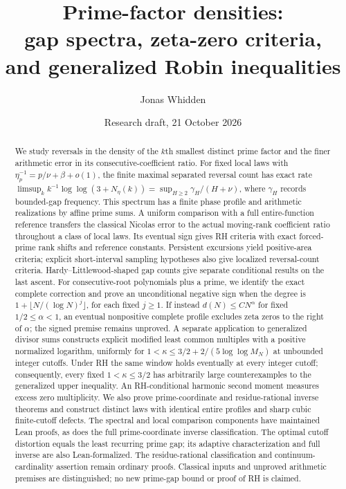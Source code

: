 \documentclass[11pt]{article}
\title{Prime-factor densities:\\ gap spectra, zeta-zero criteria,\\ and generalized Robin inequalities}
\author{Jonas Whidden}
\date{Research draft, 21 October 2026}
\theoremstyle{definition}
\begin{document}
\maketitle
\begin{abstract}
We study reversals in the density of the $k$th smallest distinct prime
factor and the finer arithmetic error in its consecutive-coefficient
ratio. For fixed local laws with $\eta_p^{-1}=p/\nu+\beta+o(1)$,
the finite maximal separated reversal count has exact rate
$\limsup_k k^{-1}\log\log(3+N_\eta(k))
=\sup_{H\ge2}\gamma_H/(H+\nu)$, where $\gamma_H$ records bounded-gap
frequency. This spectrum has a finite phase profile and arithmetic
realizations by affine prime sums.
A uniform comparison with a full entire-function reference transfers
the classical Nicolas error to the actual moving-rank coefficient
ratio throughout a class of local laws. Its eventual sign gives RH
criteria with exact forced-prime rank shifts and reference constants.
Persistent excursions yield positive-area criteria; explicit
short-interval sampling hypotheses also give localized reversal-count
criteria. Hardy--Littlewood-shaped gap counts give separate
conditional results on the last ascent.
For consecutive-root polynomials plus a prime, we identify the exact
complete correction and prove an unconditional negative sign when
the degree is $1+\lfloor N/(\log N)^j\rfloor$, for each fixed $j\ge1$.
If instead $d(N)\le CN^\alpha$ for fixed $1/2\le\alpha<1$,
an eventual nonpositive complete profile excludes zeta zeros to
the right of $\alpha$; the signed premise remains unproved.
A separate application to generalized divisor sums constructs explicit
modified least common multiples with a positive normalized logarithm,
uniformly for $1<\kappa\le3/2+2/(5\log\log M_N)$ at unbounded integer
cutoffs. Under RH the same window holds eventually at every integer
cutoff; consequently, every fixed $1<\kappa\le3/2$ has arbitrarily
large counterexamples to the generalized upper inequality.
An RH-conditional harmonic second moment measures excess zero multiplicity.
We also prove prime-coordinate and residue-rational inverse theorems and
construct distinct laws with identical entire profiles and sharp cubic
finite-cutoff defects. The spectral and local comparison components have
maintained Lean proofs, as does the full prime-coordinate inverse classification.
The optimal cutoff distortion equals the least recurring prime gap; its
adaptive characterization and full inverse are also Lean-formalized.
The residue-rational classification and continuum-cardinality assertion
remain ordinary proofs. Classical inputs and unproved
arithmetic premises are distinguished; no new prime-gap bound or proof of
RH is claimed.
\end{abstract}
\end{document}
